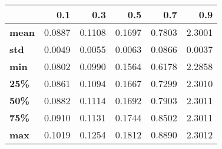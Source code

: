 \begin{tabular}{lrrrrr}
\toprule
{} &     0.1 &     0.3 &     0.5 &     0.7 &     0.9 \\
\midrule
\textbf{mean} &  0.0887 &  0.1108 &  0.1697 &  0.7803 &  2.3001 \\
\textbf{std } &  0.0049 &  0.0055 &  0.0063 &  0.0866 &  0.0037 \\
\textbf{min } &  0.0802 &  0.0990 &  0.1564 &  0.6178 &  2.2858 \\
\textbf{25\% } &  0.0861 &  0.1094 &  0.1667 &  0.7299 &  2.3010 \\
\textbf{50\% } &  0.0882 &  0.1114 &  0.1692 &  0.7903 &  2.3011 \\
\textbf{75\% } &  0.0910 &  0.1131 &  0.1744 &  0.8502 &  2.3011 \\
\textbf{max } &  0.1019 &  0.1254 &  0.1812 &  0.8890 &  2.3012 \\
\bottomrule
\end{tabular}
